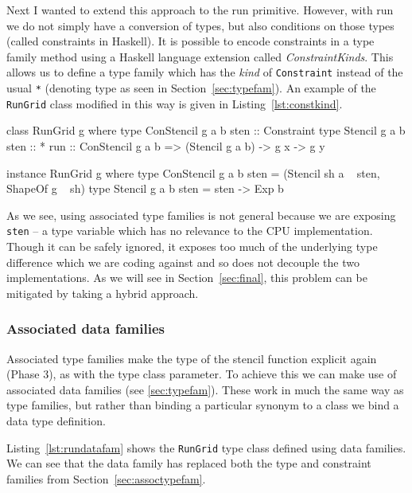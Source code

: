 \documentclass[
    12pt,
    a4paper,
    twoside,
    openright,
    ]{scrbook}
\begin{document}
Next I wanted to extend this approach to the run primitive. However, with run we
do not simply have a conversion of types, but also conditions on those types
(called constraints in Haskell). It is possible to encode constraints in a type
family method using a Haskell language extension called
\emph{ConstraintKinds}. This allows us to define a type family which has the
\emph{kind} of \texttt{Constraint} instead of the usual \texttt{*} (denoting
type as seen in Section~\ref{sec:typefam}). An example of the \texttt{RunGrid}
class modified in this way is given in Listing~\ref{lst:constkind}.

\begin{hlisting}[label={lst:constkind}, caption={The application of type
    families to the run primitive.}]
class RunGrid g where
    type ConStencil g a b sten :: Constraint
    type Stencil g a b sten :: *
    run :: ConStencil g a b => (Stencil g a b) -> g x -> g y

instance RunGrid g where
    type ConStencil g a b sten = (Stencil sh a ~ sten, ShapeOf g ~ sh)
    type Stencil g a b sten = sten -> Exp b
\end{hlisting}

As we see, using associated type families is not general because we are exposing
\texttt{sten} -- a type variable which has no relevance to the CPU
implementation. Though it can be safely ignored, it exposes too much of the
underlying type difference which we are coding against and so does not decouple
the two implementations. As we will see in Section~\ref{sec:final}, this problem
can be mitigated by taking a hybrid approach.

\subsubsection{Associated data families}
\label{sec:assoc-data-fam}

Associated type families make the type of the stencil function explicit again
(Phase 3), as with the type class parameter. To achieve this we can make use of
associated data families (see \autoref{sec:typefam}). These work in much the
same way as type families, but rather than binding a particular synonym to a
class we bind a data type definition.

Listing~\ref{lst:rundatafam} shows the \texttt{RunGrid} type class defined using
data families. We can see that the data family has replaced both the type and
constraint families from Section~\ref{sec:assoctypefam}.
\end{document}
